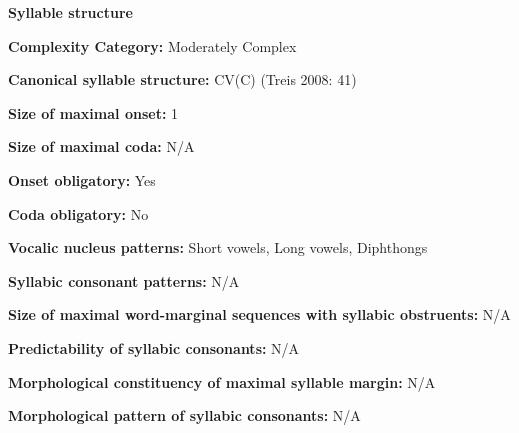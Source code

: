 \begin{styleBody}
\textbf{Syllable structure}
\end{styleBody}

\begin{styleBody}
\textbf{Complexity Category:} Moderately Complex
\end{styleBody}

\begin{styleBody}
\textbf{Canonical syllable structure:} CV(C)\textbf{ }(Treis 2008: 41)
\end{styleBody}

\begin{styleBody}
\textbf{Size of maximal onset:} 1
\end{styleBody}

\begin{styleBody}
\textbf{Size of maximal coda: }N/A
\end{styleBody}

\begin{styleBody}
\textbf{Onset obligatory:} Yes
\end{styleBody}

\begin{styleBody}
\textbf{Coda obligatory:} No
\end{styleBody}

\begin{styleBody}
\textbf{Vocalic nucleus patterns: }Short vowels, Long vowels, Diphthongs
\end{styleBody}

\begin{styleBody}
\textbf{Syllabic consonant patterns:} N/A
\end{styleBody}

\begin{styleBody}
\textbf{Size of maximal word{}-marginal sequences with syllabic obstruents:} N/A
\end{styleBody}

\begin{styleBody}
\textbf{Predictability of syllabic consonants:} N/A
\end{styleBody}

\begin{styleBody}
\textbf{Morphological constituency of maximal syllable margin:} N/A
\end{styleBody}

\begin{styleBody}
\textbf{Morphological pattern of syllabic consonants:} N/A
\end{styleBody}

